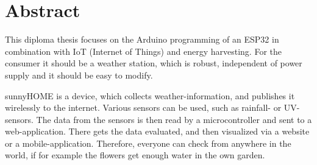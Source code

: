 

\chapter*{Abstract}



This diploma thesis focuses on the Arduino programming of an ESP32 in combination with IoT (Internet of Things) and energy harvesting. For the consumer it should be a weather station, which is robust, independent of power supply and it should be easy to modify. 

\grqq{}sunnyHOME\grqq{} is a device, which collects weather-information, and publishes it wirelessly to the internet. Various sensors can be used, such as rainfall- or UV-sensors. The data from the sensors is then read by a microcontroller and sent to a web-application. There gets the data evaluated, and then visualized via a website or a mobile-application. Therefore, everyone can check from anywhere in the world, if for example the flowers get enough water in the own garden. 